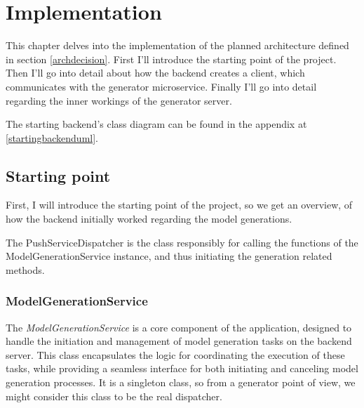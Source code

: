 \chapter{Implementation} \label{Implementation}

	This chapter delves into the implementation of the planned architecture defined in section \ref{archdecision}.
	First I'll introduce the starting point of the project.
	Then I'll go into detail about how the backend creates a client, which communicates with the generator microservice. Finally I'll go into detail
	regarding the inner workings of the generator server.

	The starting backend's class diagram can be found in the appendix at \ref{startingbackenduml}.

	\section{Starting point} \label{Starting point}
		First, I will introduce the starting point of the project, so we get an overview, of how the backend initially worked regarding the model
		generations.

		The PushServiceDispatcher is the class responsibly for calling the functions of the ModelGenerationService instance, and thus initiating
		the generation related methods.

		\subsection{ModelGenerationService} \label{ModelGenerationService}
			The \textit{ModelGenerationService} is a core component of the application, designed to handle the initiation and management of
			model generation tasks on the backend server. This class encapsulates the logic for coordinating the execution of these 
			tasks, while providing a seamless interface for both initiating and canceling model generation processes.
			It is a singleton class, so from a generator point of view, we might consider this class to be the real dispatcher.

